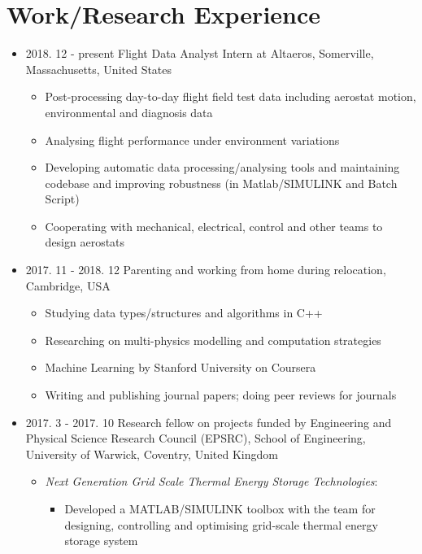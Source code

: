 \documentclass[letterpaper]{article}
\begin{document}
\vspace{-12pt}
\section*{Work/Research Experience}
\vspace{-10pt}
\begin{itemize}
\item 2018. 12 - present \hspace{2pt} Flight Data Analyst Intern at Altaeros, Somerville, Massachusetts, United States
	\begin{itemize}
	\item Post-processing day-to-day flight field test data including aerostat motion, environmental and diagnosis data
	\item Analysing flight performance under environment variations
	\item Developing automatic data processing/analysing tools and maintaining codebase and improving robustness (in Matlab/SIMULINK and Batch Script)
	\item Cooperating with mechanical, electrical, control and other teams to design aerostats
	\end{itemize}
\item 2017. 11 - 2018. 12 \hspace{2pt} Parenting and working from home during relocation, Cambridge, USA
		\begin{itemize}
		\item Studying data types/structures and algorithms in C++
		\item Researching on multi-physics modelling and computation strategies
		\item Machine Learning by Stanford University on Coursera
		\item Writing and publishing journal papers; doing peer reviews for journals
		\end{itemize}		
\item 2017. 3 - 2017. 10  \hspace{2pt} Research fellow on projects funded by Engineering and Physical Science Research Council (EPSRC), School of Engineering, University of Warwick, Coventry, United Kingdom
		\begin{itemize}
		\item \textsl{	Next Generation Grid Scale Thermal Energy Storage Technologies}: 
					\begin{itemize}
					\item Developed a MATLAB/SIMULINK toolbox with the team for designing, controlling and optimising grid-scale thermal energy storage system%

\end{itemize}
\end{itemize}
\end{itemize}
\end{document}
